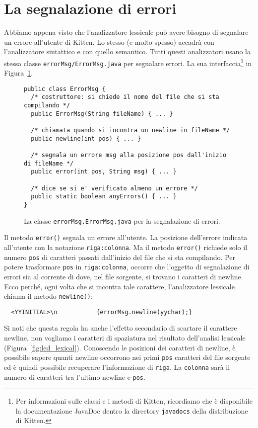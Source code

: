 \section{La segnalazione di errori}\label{sec:errors}
%
Abbiamo appena visto che l'analizzatore lessicale pu\`o avere bisogno
di segnalare un errore all'utente di Kitten. Lo stesso (e molto \piu
spesso) accadr\`a con l'analizzatore sintattico e con quello semantico.
Tutti questi analizzatori usano la stessa classe
\texttt{errorMsg/ErrorMsg.java} per segnalare
errori. La sua interfaccia\footnote{
Per \piu informazioni sulle classi e i metodi di Kitten, ricordiamo
che \`e disponibile la documentazione JavaDoc dentro la
directory \texttt{javadocs} della distribuzione di Kitten.}
\e in Figura~\ref{fig:errorMsg.ErrorMsg}.
%
\begin{figure}[t]
\begin{verbatim}
public class ErrorMsg {
  /* costruttore: si chiede il nome del file che si sta compilando */
  public ErrorMsg(String fileName) { ... }

  /* chiamata quando si incontra un newline in fileName */
  public newline(int pos) { ... }

  /* segnala un errore msg alla posizione pos dall'inizio di fileName */
  public error(int pos, String msg) { ... }

  /* dice se si e' verificato almeno un errore */
  public static boolean anyErrors() { ... }
}
\end{verbatim}
\caption{La classe \texttt{errorMsg.ErrorMsg.java} per la segnalazione di errori.}\label{fig:errorMsg.ErrorMsg}
\end{figure}
%
Il metodo \texttt{error()} segnala un errore all'utente. La posizione
dell'errore \e indicata all'utente con la notazione \texttt{riga:colonna}.
Ma il metodo \texttt{error()} richiede solo il numero \texttt{pos}
di caratteri passati dall'inizio del file che si sta compilando.
Per potere trasformare \texttt{pos} in \texttt{riga:colonna}, occorre
che l'oggetto di segnalazione di errori sia al corrente di dove, nel
file sorgente, si trovano i caratteri di newline. Ecco perch\'e, ogni volta
che si incontra tale carattere, l'analizzatore lessicale chiama il
metodo \texttt{newline()}:
%
\begin{verbatim}
  <YYINITIAL>\n           {errorMsg.newline(yychar);}
\end{verbatim}
%
Si noti che questa regola ha anche l'effetto secondario di
scartare il carattere newline, \poiche non vogliamo
i caratteri di spaziatura nel risultato dell'analisi lessicale
(Figura~\ref{fig:led_lexical}). Conoscendo le posizioni dei caratteri
di newline, \`e possibile sapere quanti newline occorrono nei primi
\texttt{pos} caratteri del file sorgente ed \`e quindi possibile
recuperare l'informazione di \texttt{riga}. La \texttt{colonna}
sar\`a il numero di caratteri tra l'ultimo newline e \texttt{pos}.

